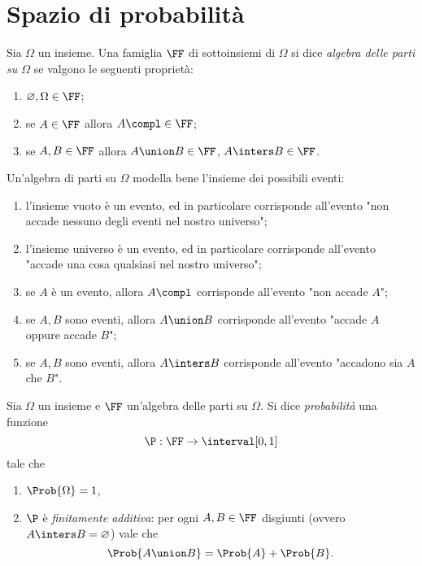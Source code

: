 \section{Spazio di probabilità}

\begin{definition}
    Sia $\Omega$ un insieme. Una famiglia $\FF$ di sottoinsiemi di $\Omega$ si dice \emph{algebra delle parti su $\Omega$} se valgono le seguenti proprietà: \begin{enumerate}[label={(\roman*)}]
        \item $\varnothing, \Omega \in \FF$;
        \item se $A \in \FF$ allora $A\compl \in \FF$;
        \item se $A, B \in \FF$ allora $A \union B \in \FF$, $A \inters B \in \FF$.
    \end{enumerate}
\end{definition}

Un'algebra di parti su $\Omega$ modella bene l'insieme dei possibili eventi: \begin{enumerate}[label={(\roman*)}]
    \item l'insieme vuoto è un evento, ed in particolare corrisponde all'evento "non accade nessuno degli eventi nel nostro universo";
    \item l'insieme universo è un evento, ed in particolare corrisponde all'evento "accade una cosa qualsiasi nel nostro universo";
    \item se $A$ è un evento, allora $A\compl$ corrisponde all'evento "non accade $A$";
    \item se $A, B$ sono eventi, allora $A \union B$ corrisponde all'evento "accade $A$ oppure accade $B$";
    \item se $A, B$ sono eventi, allora $A \inters B$ corrisponde all'evento "accadono sia $A$ che $B$".
\end{enumerate}

\begin{definition}
    [Probabilità]
    Sia $\Omega$ un insieme e $\FF$ un'algebra delle parti su $\Omega$. Si dice \emph{probabilità} una funzione \[
        \P : \FF \to \interval[{0, 1}]  
    \] tale che \begin{enumerate}
        \item $\Prob{\Omega} = 1$,
        \item \label{def:prob_finit_add} $\P$ è \emph{finitamente additiva}: per ogni $A, B \in \FF$ disgiunti (ovvero $A \inters B = \varnothing$) vale che \[
            \Prob{A \union B} = \Prob{A} + \Prob{B}.
        \]
    \end{enumerate}
\end{definition}

